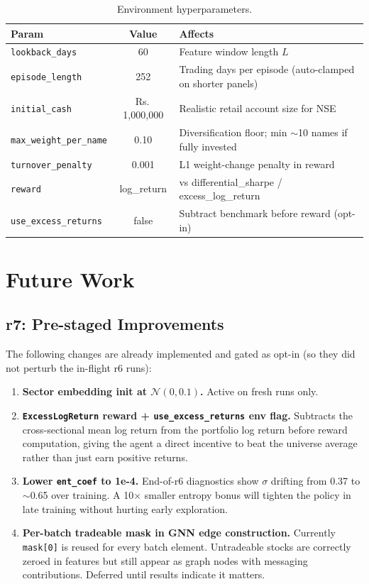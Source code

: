 \documentclass[11pt,a4paper]{article}
\begin{document}
\begin{table}[h]
\centering
\small
\caption{Environment hyperparameters.}
\begin{tabularx}{\textwidth}{l c X}
\toprule
\textbf{Param} & \textbf{Value} & \textbf{Affects} \\
\midrule
\texttt{lookback\_days} & 60 & Feature window length $L$ \\
\texttt{episode\_length} & 252 & Trading days per episode (auto-clamped on shorter panels) \\
\texttt{initial\_cash} & \textrm{Rs.}\,1{,}000{,}000 & Realistic retail account size for NSE \\
\texttt{max\_weight\_per\_name} & 0.10 & Diversification floor; min $\sim$10 names if fully invested \\
\texttt{turnover\_penalty} & 0.001 & L1 weight-change penalty in reward \\
\texttt{reward} & log\_return & vs differential\_sharpe / excess\_log\_return \\
\texttt{use\_excess\_returns} & false & Subtract benchmark before reward (opt-in) \\
\bottomrule
\end{tabularx}
\end{table}

\section{Future Work}

\subsection{r7: Pre-staged Improvements}

The following changes are already implemented and gated as opt-in (so they did
not perturb the in-flight r6 runs):

\begin{enumerate}
\item \textbf{Sector embedding init at $\mathcal{N}(0, 0.1)$.}
Active on fresh runs only.
\item \textbf{\texttt{ExcessLogReturn} reward + \texttt{use\_excess\_returns} env flag.}
Subtracts the cross-sectional mean log return from the portfolio log return before
reward computation, giving the agent a direct incentive to beat the universe
average rather than just earn positive returns.
\item \textbf{Lower \texttt{ent\_coef} to 1e-4.}
End-of-r6 diagnostics show $\sigma$ drifting from 0.37 to $\sim$0.65 over training.
A 10$\times$ smaller entropy bonus will tighten the policy in late training without
hurting early exploration.
\item \textbf{Per-batch tradeable mask in GNN edge construction.}
Currently \texttt{mask[0]} is reused for every batch element. Untradeable stocks are
correctly zeroed in features but still appear as graph nodes with messaging
contributions. Deferred until results indicate it matters.
\end{enumerate}
\end{document}

